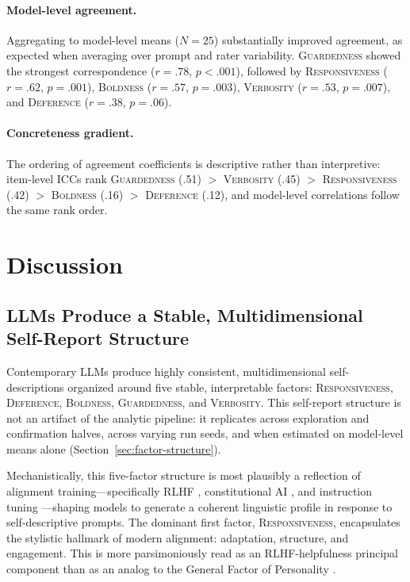 \documentclass[11pt]{article}
\newcommand{\factorname}[1]{\textsc{#1}}
\begin{document}
\paragraph{Model-level agreement.}
Aggregating to model-level means ($N = 25$) substantially improved agreement, as expected when averaging over prompt and rater variability.
\factorname{Guardedness} showed the strongest correspondence ($r = .78$, $p < .001$), followed by \factorname{Responsiveness} ($r = .62$, $p = .001$), \factorname{Boldness} ($r = .57$, $p = .003$), \factorname{Verbosity} ($r = .53$, $p = .007$), and \factorname{Deference} ($r = .38$, $p = .06$).

\paragraph{Concreteness gradient.}
The ordering of agreement coefficients is descriptive rather than interpretive: item-level ICCs rank \factorname{Guardedness} (.51) $>$ \factorname{Verbosity} (.45) $>$ \factorname{Responsiveness} (.42) $>$ \factorname{Boldness} (.16) $>$ \factorname{Deference} (.12), and model-level correlations follow the same rank order.

\section{Discussion}
\label{sec:discussion}

\subsection{LLMs Produce a Stable, Multidimensional Self-Report Structure}
\label{sec:discussion-self-theory}

Contemporary LLMs produce highly consistent, multidimensional self-descriptions organized around five stable, interpretable factors: \factorname{Responsiveness}, \factorname{Deference}, \factorname{Boldness}, \factorname{Guardedness}, and \factorname{Verbosity}. This self-report structure is not an artifact of the analytic pipeline: it replicates across exploration and confirmation halves, across varying run seeds, and when estimated on model-level means alone (Section~\ref{sec:factor-structure}).

Mechanistically, this five-factor structure is most plausibly a reflection of alignment training---specifically RLHF \citep{ziegler2020finetuning}, constitutional AI \citep{bai2022constitutional}, and instruction tuning \citep{ouyang2022traininglanguagemodelsfollow}---shaping models to generate a coherent linguistic profile in response to self-descriptive prompts. The dominant first factor, \factorname{Responsiveness}, encapsulates the stylistic hallmark of modern alignment: adaptation, structure, and engagement. This is more parsimoniously read as an RLHF-helpfulness principal component than as an analog to the General Factor of Personality \citep{musek2007general}.
\end{document}

